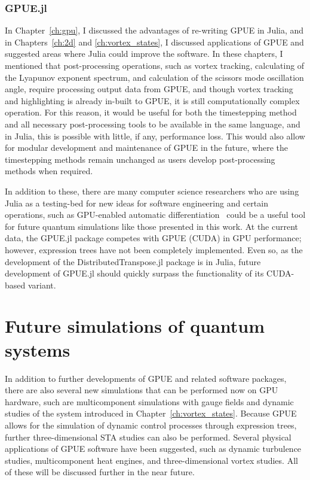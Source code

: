 \subsubsection{GPUE.jl}

In Chapter~\ref{ch:gpu}, I discussed the advantages of re-writing GPUE in Julia, and in Chapters~\ref{ch:2d} and \ref{ch:vortex_states}, I discussed applications of GPUE and suggested areas where Julia could improve the software.
In these chapters, I mentioned that post-processing operations, such as vortex tracking, calculating of the Lyapunov exponent spectrum, and calculation of the scissors mode oscillation angle, require processing output data from GPUE, and though vortex tracking and highlighting is already in-built to GPUE, it is still computationally complex operation.
For this reason, it would be useful for both the timestepping method and all necessary post-processing tools to be available in the same language, and in Julia, this is possible with little, if any, performance loss.
This would also allow for modular development and maintenance of GPUE in the future, where the timestepping methods remain unchanged as users develop post-processing methods when required.

In addition to these, there are many computer science researchers who are using Julia as a testing-bed for new ideas for software engineering and certain operations, such as GPU-enabled automatic differentiation~\cite{revels2018} could be a useful tool for future quantum simulations like those presented in this work.
At the current data, the GPUE.jl package competes with GPUE (CUDA) in GPU performance; however, expression trees have not been completely implemented.
Even so, as the development of the DistributedTranspose.jl package is in Julia, future development of GPUE.jl should quickly surpass the functionality of its CUDA-based variant.

\section{Future simulations of quantum systems}

In addition to further developments of GPUE and related software packages, there are also several new simulations that can be performed now on GPU hardware, such are multicomponent simulations with gauge fields and dynamic studies of the system introduced in Chapter~\ref{ch:vortex_states}.
Because GPUE allows for the simulation of dynamic control processes through expression trees, further three-dimensional STA studies can also be performed.
Several physical applications of GPUE software have been suggested, such as dynamic turbulence studies, multicomponent heat engines, and three-dimensional vortex studies.
All of these will be discussed further in the near future.

